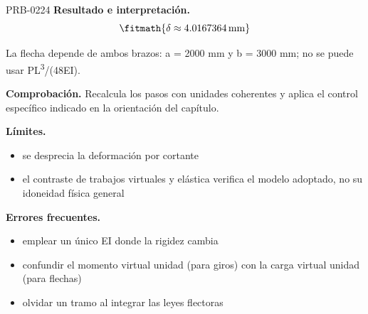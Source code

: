 \begin{studiumworked}{PRB-0224}
\textbf{Resultado e interpretación.}\[\fitmath{\delta \approx 4.0167364\,\mathrm{mm}}\]

La flecha depende de ambos brazos: a = 2000 mm y b = 3000 mm; no se puede usar PL\textsuperscript{3}/(48EI).

\par\textbf{Comprobación.} Recalcula los pasos con unidades coherentes y aplica el control específico indicado en la orientación del capítulo.

\textbf{Límites.}\begin{itemize}\item se desprecia la deformación por cortante
\item el contraste de trabajos virtuales y elástica verifica el modelo adoptado, no su idoneidad física general\end{itemize}

\textbf{Errores frecuentes.}\begin{itemize}\item emplear un único EI donde la rigidez cambia
\item confundir el momento virtual unidad (para giros) con la carga virtual unidad (para flechas)
\item olvidar un tramo al integrar las leyes flectoras\end{itemize}

\end{studiumworked}

\Needspace{.3\textheight}

